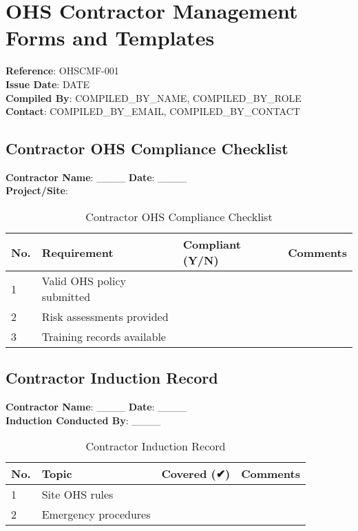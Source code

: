 \documentclass[11pt]{article}
\newcommand{\docTitle}{OHS Contractor Management Forms and Templates}
\newcommand{\refNumber}{OHSCMF-001}
\newcommand{\issueDate}{{{DATE}}}
\newcommand{\location}{}
\newcommand{\compilerName}{{{COMPILED_BY_NAME}}}
\newcommand{\compilerRole}{{{COMPILED_BY_ROLE}}}
\newcommand{\compilerEmail}{{{COMPILED_BY_EMAIL}}}
\newcommand{\compilerPhone}{{{COMPILED_BY_CONTACT}}}
\begin{document}
\section*{\docTitle}
\textbf{Reference}: \refNumber \\
\textbf{Issue Date}: \issueDate \\
\textbf{Compiled By}: \compilerName, \compilerRole \\
\textbf{Contact}: \compilerEmail, \compilerPhone

\subsection*{Contractor OHS Compliance Checklist}

\textbf{Contractor Name}: \_\_\_\_ \textbf{Date}: \_\_\_\_ \\
\textbf{Project/Site}: \location

\begin{table}[h]
    \centering
    \begin{tabular}{p{1cm}p{5cm}p{2cm}p{3cm}}
        \toprule
        \textbf{No.} & \textbf{Requirement} & \textbf{Compliant (Y/N)} & \textbf{Comments} \\
        \midrule
        1 & Valid OHS policy submitted & & \\
        2 & Risk assessments provided & & \\
        3 & Training records available & & \\
        \bottomrule
    \end{tabular}
    \caption{Contractor OHS Compliance Checklist}
\end{table}

\subsection*{Contractor Induction Record}

\textbf{Contractor Name}: \_\_\_\_ \textbf{Date}: \_\_\_\_ \\
\textbf{Induction Conducted By}: \_\_\_\_

\begin{table}[h]
    \centering
    \begin{tabular}{p{1cm}p{4cm}p{2cm}p{3cm}}
        \toprule
        \textbf{No.} & \textbf{Topic} & \textbf{Covered (✔)} & \textbf{Comments} \\
        \midrule
        1 & Site OHS rules & & \\
        2 & Emergency procedures & & \\
        \bottomrule
    \end{tabular}
    \caption{Contractor Induction Record}
\end{table}
\end{document}

